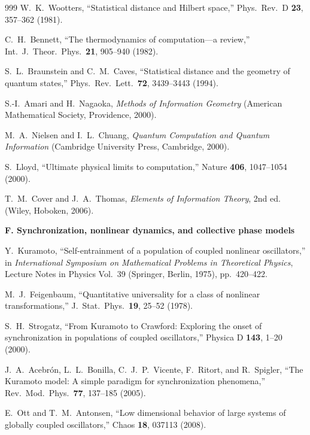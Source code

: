 \documentclass[11pt,a4paper,twoside]{book}
\theoremstyle{definition}
\begin{document}
\begin{thebibliography}{999}
W.~K.~Wootters,
``Statistical distance and Hilbert space,''
Phys.\ Rev.\ D \textbf{23}, 357--362 (1981).

C.~H.~Bennett,
``The thermodynamics of computation---a review,''
Int.\ J.\ Theor.\ Phys.\ \textbf{21}, 905--940 (1982).

S.~L.~Braunstein and C.~M.~Caves,
``Statistical distance and the geometry of quantum states,''
Phys.\ Rev.\ Lett.\ \textbf{72}, 3439--3443 (1994).

S.-I.~Amari and H.~Nagaoka,
\emph{Methods of Information Geometry}
(American Mathematical Society, Providence, 2000).

M.~A.~Nielsen and I.~L.~Chuang,
\emph{Quantum Computation and Quantum Information}
(Cambridge University Press, Cambridge, 2000).

S.~Lloyd,
``Ultimate physical limits to computation,''
Nature \textbf{406}, 1047--1054 (2000).

T.~M.~Cover and J.~A.~Thomas,
\emph{Elements of Information Theory}, 2nd ed.
(Wiley, Hoboken, 2006).

\item[]\textbf{F. Synchronization, nonlinear dynamics, and collective phase models}

Y.~Kuramoto,
``Self-entrainment of a population of coupled nonlinear oscillators,'' in
\emph{International Symposium on Mathematical Problems in Theoretical Physics},
Lecture Notes in Physics Vol.~39 (Springer, Berlin, 1975), pp.~420--422.

M.~J.~Feigenbaum,
``Quantitative universality for a class of nonlinear transformations,''
J.\ Stat.\ Phys.\ \textbf{19}, 25--52 (1978).

S.~H.~Strogatz,
``From Kuramoto to Crawford: Exploring the onset of synchronization in
populations of coupled oscillators,''
Physica D \textbf{143}, 1--20 (2000).

J.~A.~Acebr\'on, L.~L.~Bonilla, C.~J.~P.~Vicente, F.~Ritort, and R.~Spigler,
``The Kuramoto model: A simple paradigm for synchronization phenomena,''
Rev.\ Mod.\ Phys.\ \textbf{77}, 137--185 (2005).

E.~Ott and T.~M.~Antonsen,
``Low dimensional behavior of large systems of globally coupled oscillators,''
Chaos \textbf{18}, 037113 (2008).


\end{thebibliography}
\end{document}
